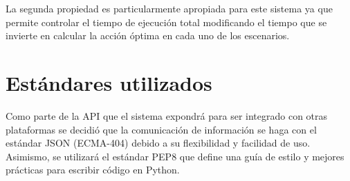 La segunda propiedad es particularmente apropiada para este sistema ya que permite 
controlar el tiempo de ejecución total modificando el tiempo que se invierte en calcular la 
acción óptima en cada uno de los escenarios.

\section{Estándares utilizados}

Como parte de la API que el sistema expondrá para ser integrado con otras plataformas se 
decidió que la comunicación de información se haga con el estándar JSON (ECMA-404) 
debido a su flexibilidad y facilidad de uso. Asimismo, se utilizará el estándar PEP8 que 
define una guía de estilo y mejores prácticas para escribir código en Python.



 



